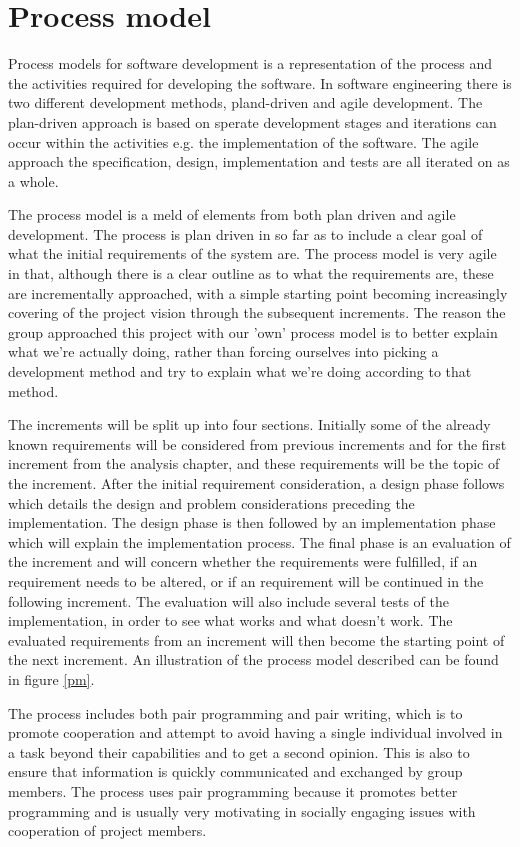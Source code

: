\chapter{Process model}
\label{Process model}
Process models for software development is a representation of the process and the activities required for developing the software. In software engineering there is two different development methods, pland-driven and agile development. The plan-driven approach is based on sperate development stages and iterations can occur within the activities e.g. the implementation of the software. The agile approach the specification, design, implementation and tests are all iterated on as a whole. \citep{sommerville}

The process model is a meld of elements from both plan driven and agile development. The process is plan driven in so far as to include a clear goal of what the initial requirements of the system are. The process model is very agile in that, although there is a clear outline as to what the requirements are, these are incrementally approached, with a simple starting point becoming increasingly covering of the project vision through the subsequent increments. The reason the group approached this project with our 'own' process model is to better explain what we're actually doing, rather than forcing ourselves into picking a development method and try to explain what we're doing according to that method.

The increments will be split up into four sections. Initially some of the already known requirements will be considered from previous increments and for the first increment from the analysis chapter, and these requirements will be the topic of the increment.
After the initial requirement consideration, a design phase follows which details the design and problem considerations preceding the implementation. The design phase is then followed by an implementation phase which will explain the implementation process. The final phase is an evaluation of the increment and will concern whether the requirements were fulfilled, if an requirement needs to be altered, or if an requirement will be continued in the following increment. The evaluation will also include several tests of the implementation, in order to see what works and what doesn't work. The evaluated requirements from an increment will then become the starting point of the next increment. An illustration of the process model described can be found in figure \ref{pm}.

The process includes both pair programming and pair writing, which is to promote cooperation and attempt to avoid having a single individual involved in a task beyond their capabilities and to get a second opinion. This is also to ensure that information is quickly communicated and exchanged by group members. The process uses pair programming because it promotes better programming and is usually very motivating in socially engaging issues with cooperation of project members.


